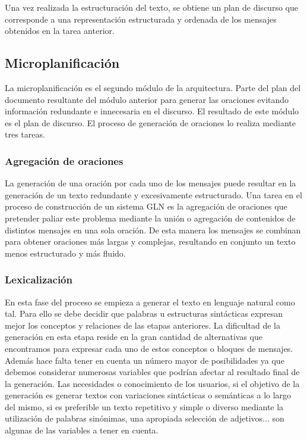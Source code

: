 Una vez realizada la estructuración del texto, se obtiene un plan de discurso que corresponde a una representación estructurada y ordenada de los mensajes obtenidos en la tarea anterior.

\subsection{Microplanificación}
La microplanificación es el segundo módulo de la arquitectura. Parte del plan del documento resultante del módulo anterior para generar las oraciones evitando información redundante e innecesaria en el discurso. El resultado de este módulo es el plan de discurso. El proceso de generación de oraciones lo realiza mediante tres tareas.

\subsubsection{Agregación de oraciones}
La generación de una oración por cada uno de los mensajes puede resultar en la generación de un texto redundante y excesivamente estructurado. Una tarea en el proceso de construcción de un sistema GLN es la agregación de oraciones que pretender paliar este problema mediante la unión o agregación de contenidos de distintos mensajes en una sola oración. De esta manera los mensajes se combinan para obtener oraciones más largas y complejas, resultando en conjunto un texto menos estructurado y más fluido.

\subsubsection{Lexicalización}
En esta fase del proceso se empieza a generar el texto en lenguaje natural como tal. Para ello se debe decidir que palabras u estructuras sintácticas expresan mejor los conceptos y relaciones de las etapas anteriores. La dificultad de la generación en esta etapa reside en la gran cantidad de alternativas que encontramos para  expresar cada uno de estos conceptos o bloques de mensajes. Además hace falta tener en cuenta un número mayor de posibilidades ya que debemos considerar numerosas variables que podrían afectar al resultado final de la generación. Las necesidades o conocimiento de los usuarios, si el objetivo de la generación es generar textos con variaciones sintácticas o semánticas a lo largo del mismo, si es preferible un texto repetitivo y simple o diverso mediante la utilización de palabras sinónimas, una apropiada selección de adjetivos... son algunas de las variables a tener en cuenta.


